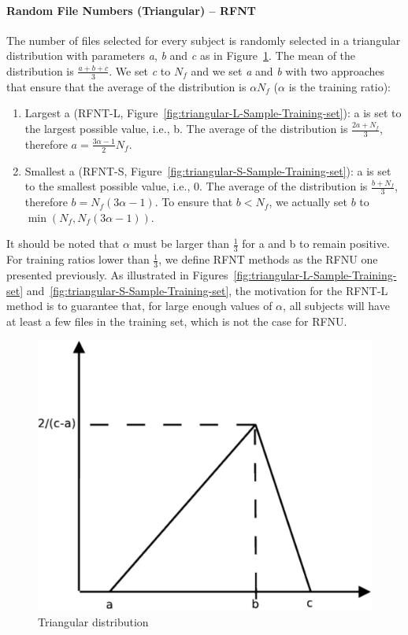 \documentclass[10pt, conference, compsocconf]{IEEEtran}
\begin{document}
\paragraph{Random File Numbers (Triangular) -- RFNT}
The number of files selected for every subject is randomly selected in
a triangular distribution with parameters \textit{a}, \textit{b} and 
\textit{c} as in Figure~\ref{fig:triangular}. The mean of the distribution is 
$\frac{a+b+c}{3}$. We set \textit{c} to $N_{f}$ and we set 
\textit{a} and \textit{b} with two approaches that ensure that the 
average of the distribution is $\alpha N_{f}$ ($\alpha$ is the training 
ratio):
\begin{enumerate}
        \item Largest a (RFNT-L, Figure~\ref{fig:triangular-L-Sample-Training-set}): a is set to the 
        largest possible value, i.e., b. The average of the 
        distribution is $\frac{2a+N_{f}}{3}$, therefore 
        $a=\frac{3\alpha-1}{2}N_{f}$.
                \item Smallest a (RFNT-S, Figure~\ref{fig:triangular-S-Sample-Training-set}): a is 
        set to the smallest possible value, i.e., 0. The average of the 
        distribution is $\frac{b+N_{f}}{3}$, therefore 
        $b=N_{f}(3\alpha-1)$. To ensure that $b<N_{f}$, we actually set 
        $b$ to $\min(N_{f}, N_{f}(3\alpha-1))$. 
\end{enumerate}
It should be noted that $\alpha$ must be larger than $\frac{1}{3}$ for 
a and b to remain positive. For training ratios lower than $\frac{1}{3}$, we 
define RFNT methods as the RFNU one presented previously.
As illustrated in Figures~\ref{fig:triangular-L-Sample-Training-set} 
and~\ref{fig:triangular-S-Sample-Training-set}, the motivation for the 
RFNT-L method is to guarantee that, for large enough values of 
$\alpha$, all subjects will have at least a few files in the training 
set, which is not the case for RFNU.
\begin{figure}
\centering
\includegraphics[width=0.5\columnwidth]{figures/triangular.pdf}
\caption{Triangular distribution}
\label{fig:triangular}
\end{figure}
\end{document}
